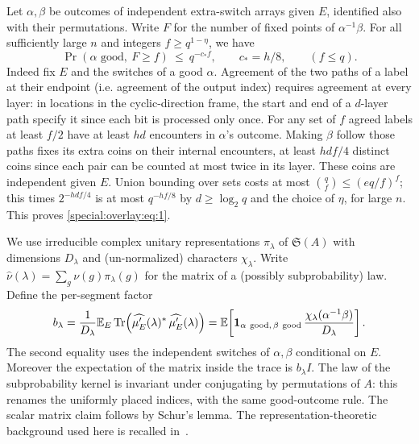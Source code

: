 Let \(\alpha,\beta\) be outcomes of independent extra-switch arrays given \(E\), identified also with their permutations. Write \(F\) for the number of fixed points of \(\alpha^{-1}\beta\). For all sufficiently large \(n\) and integers \(f\ge q^{1-\eta}\), we have
\begin{equation}
 \Pr(\alpha\text{ good},\ F\ge f)\ \le\ q^{-c_* f},
 \qquad c_*=h/8,\qquad (f\le q).                                      \label{special:overlay:eq:1}
\end{equation}
Indeed fix \(E\) and the switches of a good \(\alpha\). Agreement of the two paths of a label at their endpoint (i.e. agreement of the output index) requires agreement at every layer: in locations in the cyclic-direction frame, the start and end of a \(d\)-layer path specify it since each bit is processed only once. For any set of \(f\) agreed labels at least \(f/2\) have at least \(hd\) encounters in \(\alpha\)'s outcome. Making \(\beta\) follow those paths fixes its extra coins on their internal encounters, at least \(hdf/4\) distinct coins since each pair can be counted at most twice in its layer. These coins are independent given \(E\). Union bounding over sets costs at most \(\binom{q}{f}\le(e q/f)^f\); this times \(2^{-hdf/4}\) is at most \(q^{-h f/8}\) by \(d\ge\log_2 q\) and the choice of \(\eta\), for large \(n\). This proves \eqref{special:overlay:eq:1}.

We use irreducible complex unitary representations \(\pi_\lambda\) of \(\mathfrak S(A)\) with dimensions \(D_\lambda\) and (un-normalized) characters \(\chi_\lambda\). Write \(\widehat\nu(\lambda)=\sum_g\nu(g)\pi_\lambda(g)\) for the matrix of a (possibly subprobability) law. Define the per-segment factor
\begin{equation}
 b_\lambda=\frac{1}{D_\lambda}\mathbb E_E\operatorname{Tr}\!\left(
       \widehat{\mu'_E}(\lambda)^*\,\widehat{\mu'_E}(\lambda)\right)
  =\mathbb E\!\left[
       \mathbf 1_{\alpha\ {\rm good},\,\beta\ {\rm good}}\,
       \frac{\chi_\lambda(\alpha^{-1}\beta)}{D_\lambda}\right].          \label{special:overlay:eq:2}
\end{equation}
The second equality uses the independent switches of \(\alpha,\beta\) conditional on \(E\). Moreover the expectation of the matrix inside the trace is \(b_\lambda I\). The law of the subprobability kernel is invariant under conjugating by permutations of \(A\): this renames the uniformly placed indices, with the same good-outcome rule. The scalar matrix claim follows by Schur's lemma.
The representation-theoretic background used here is recalled in~\cite{sagan,etingof}.

